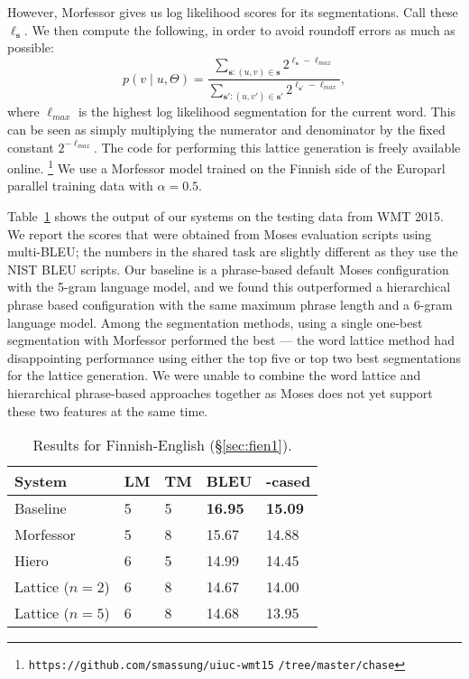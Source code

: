 However, Morfessor gives us log likelihood scores for its segmentations.
%
Call these $\ell_{\mathbf{s}}$.
%
We then compute the following, in order to avoid roundoff errors as much as possible:
\[
p(v \mid u, \Theta) = \frac{\sum_{\mathbf{s} : (u, v) \in \mathbf{s}}
2^{\ell_\mathbf{s} - \ell_{max}}}{\sum_{\mathbf{s'} : (u, v') \in
\mathbf{s'}} 2^{\ell_{\mathbf{s'}} - \ell_{max}}},
\]
where $\ell_{max}$ is the highest log likelihood segmentation for the current word.
%
This can be seen as simply multiplying the numerator and denominator by the fixed constant $2^{-\ell_{max}}$.
%
The code for performing this lattice generation is freely available online.%
%
\footnote{\texttt{https://github.com/smassung/uiuc-wmt15}
\texttt{/tree/master/chase}}
%
We use a Morfessor model trained on the Finnish side of the Europarl parallel training data with $\alpha = 0.5$.

Table~\ref{tab:fien1} shows the output of our systems on the testing data from WMT 2015.
%
We report the scores that were obtained from Moses evaluation scripts using multi-BLEU; the numbers in the shared task are slightly different as they use the NIST BLEU scripts. 
%
Our baseline is a phrase-based default Moses configuration with the 5-gram language model, and we found this outperformed a hierarchical phrase based configuration with the same maximum phrase length and a 6-gram language model.
%
Among the segmentation methods, using a single one-best segmentation with Morfessor performed the best --- the word lattice method had disappointing performance using either the top five or top two best segmentations for the lattice generation.
%
We were unable to combine the word lattice and hierarchical phrase-based approaches together as Moses does not yet support these two features at the same time.

\begin{table}[!t]
\center 
{
	\begin{tabular}{|l|l|l|l|l|}
	\hline
	System                 & LM & TM      & BLEU             & -cased          \\ \hline
    Baseline               & 5  & 5       & \textbf{16.95}   & \textbf{15.09}  \\ \hline
    Morfessor              & 5  & 8       &         15.67    &         14.88   \\ \hline
    Hiero                  & 6  & 5       &         14.99    &         14.45   \\ \hline
    Lattice ($n=2$)        & 6  & 8       &         14.67    &         14.00   \\ \hline
    Lattice ($n=5$)        & 6  & 8       &         14.68    &         13.95   \\ \hline
	\end{tabular}
}
\caption{Results for Finnish-English (\S\ref{sec:fien1}).}
\label{tab:fien1}
\end{table}


